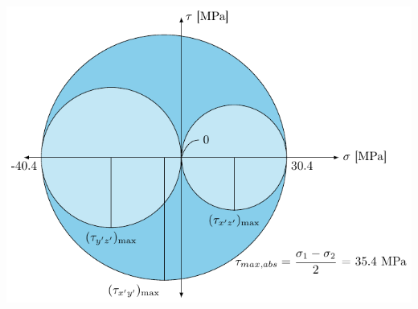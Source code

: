 \documentclass[10pt, svgnames]{beamer}
\begin{document}
\begin{frame}[label={sec:org2a9b95f}]{}
\begin{center}
\includegraphics[width=.9\linewidth]{pictures/max-abs-shear-stress-example.pdf}
\end{center}
\end{frame}
\end{document}
